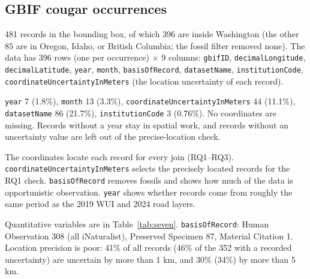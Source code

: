 \documentclass[11pt, a4paper]{article}
\begin{document}
\subsection{GBIF cougar occurrences}
\begin{sloppypar}
  \begin{description}[leftmargin=0pt, itemsep=4pt]

    \item[Size:] 481 records in the bounding box, of which 396 are inside
      Washington (the other 85 are in Oregon, Idaho, or British Columbia; the
      fossil filter removed none). The data has 396 rows (one per occurrence)
      $\times$ 9 columns: \texttt{gbifID}, \texttt{decimalLongitude},
      \texttt{decimalLatitude}, \texttt{year}, \texttt{month},
      \texttt{basisOfRecord}, \texttt{datasetName}, \texttt{institutionCode},
      \texttt{coordinateUncertaintyInMeters} (the location uncertainty of each record).

    \item[Missing:] \texttt{year} 7 (1.8\%), \texttt{month} 13 (3.3\%),
      \texttt{coordinateUncertaintyInMeters} 44 (11.1\%), \texttt{datasetName}
      86 (21.7\%), \texttt{institutionCode} 3 (0.76\%). No coordinates are missing. Records without a year stay in spatial work, and records without
      an uncertainty value are left out of the precise-location check.

    \item[Variables of interest:]
      The coordinates locate each record for every join (RQ1--RQ3).
      \texttt{coordinateUncertaintyInMeters} selects the precisely located records for the RQ1 check.
      \texttt{basisOfRecord} removes fossils and shows how much of the data is opportunistic observation.
      \texttt{year} shows whether records come from roughly the same period as the 2019 WUI and 2024 road layers.

    \item[Summaries:] Quantitative variables are in Table~\ref{tab:seven}.
      \texttt{basisOfRecord}: Human Observation 308 (all iNaturalist),
      Preserved Specimen 87, Material Citation 1. Location precision is poor: 41\% of all records (46\% of the 352 with a
      recorded uncertainty) are uncertain by more than 1 km, and 30\% (34\%) by
      more than 5 km.

  \end{description}
\end{sloppypar}
\end{document}
